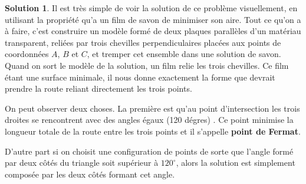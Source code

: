 \documentclass[10pt,a4paper]{article}%
\theoremstyle{theorem}
\theoremstyle{definition}
\newtheorem*{solution*}{Solution}
\begin{document}
		
		\begin{solution*}
			Il est très simple de voir la solution de ce problème visuellement, en utilisant la propriété qu'a un film de savon de minimiser son aire. Tout ce qu’on a à faire,	c’est construire un modèle formé de deux plaques parallèles d’un matériau transparent, reliées par trois chevilles perpendiculaires placées aux points de coordonnées $A$, $B$ et $C$, et tremper cet ensemble dans une solution de savon. Quand on sort le modèle de la solution, un film relie les trois chevilles. Ce film  étant une surface minimale, il nous donne exactement la forme que devrait prendre la route reliant directement les trois points. 	
			
			On peut observer deux choses. La première est qu’au point d’intersection les trois droites se rencontrent avec des angles égaux (120 dégres) . Ce point minimise la longueur totale de la route entre les trois points et il s'appelle \textbf{point de Fermat}.
			
			\begin{figure}[h]
				
			\begin{center}
			\end{center}
			\caption{}\label{ris2.figure}
			\end{figure}
			
			D’autre part si on choisit une configuration de points de sorte que l’angle formé par deux côtés du triangle soit supérieur à $120^\circ$, alors la solution est simplement composée par les deux côtés formant cet angle.
			
			\begin{center}
\end{center}
\end{solution*}
\end{document}

